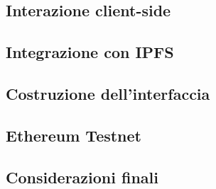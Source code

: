 \subsection{Interazione client-side}

\subsection{Integrazione con IPFS}

\subsection{Costruzione dell'interfaccia}

\subsection{Ethereum Testnet}

\subsection{Considerazioni finali}


